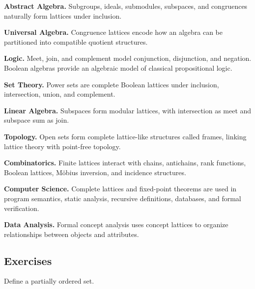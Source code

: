 \begin{applicationbox}
\textbf{Abstract Algebra.}
Subgroups, ideals, submodules, subspaces, and congruences naturally form
lattices under inclusion.

\medskip

\textbf{Universal Algebra.}
Congruence lattices encode how an algebra can be partitioned into compatible
quotient structures.

\medskip

\textbf{Logic.}
Meet, join, and complement model conjunction, disjunction, and negation.
Boolean algebras provide an algebraic model of classical propositional
logic.

\medskip

\textbf{Set Theory.}
Power sets are complete Boolean lattices under inclusion, intersection,
union, and complement.

\medskip

\textbf{Linear Algebra.}
Subspaces form modular lattices, with intersection as meet and subspace sum
as join.

\medskip

\textbf{Topology.}
Open sets form complete lattice-like structures called frames, linking
lattice theory with point-free topology.

\medskip

\textbf{Combinatorics.}
Finite lattices interact with chains, antichains, rank functions, Boolean
lattices, Möbius inversion, and incidence structures.

\medskip

\textbf{Computer Science.}
Complete lattices and fixed-point theorems are used in program semantics,
static analysis, recursive definitions, databases, and formal verification.

\medskip

\textbf{Data Analysis.}
Formal concept analysis uses concept lattices to organize relationships
between objects and attributes.
\end{applicationbox}

\subsection{Exercises}
\label{subsec:lattice-exercises}

\begin{exercise}[1]
Define a partially ordered set.
\end{exercise}

